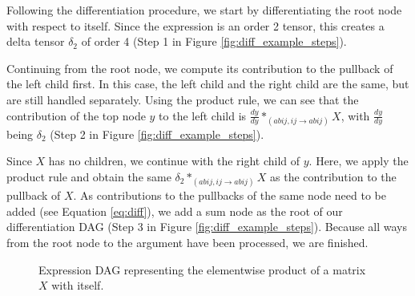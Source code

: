 \documentclass[12pt, a4paper]{report}
\begin{document}
Following the differentiation procedure, we start by differentiating the root node with respect to itself.
Since the expression is an order 2 tensor, this creates a delta tensor $\delta_2$ of order 4 (Step 1 in Figure \ref{fig:diff_example_steps}).

Continuing from the root node, we compute its contribution to the pullback of the left child first.
In this case, the left child and the right child are the same, but are still handled separately.
Using the product rule, we can see that the contribution of the top node $y$ to the left child is $\frac{dy}{dy} *_{(abij,ij \rightarrow abij)} X$, with $\frac{dy}{dy}$ being $\delta_2$ (Step 2 in Figure \ref{fig:diff_example_steps}).

Since $X$ has no children, we continue with the right child of $y$.
Here, we apply the product rule and obtain the same $\delta_2 *_{(abij,ij \rightarrow abij)} X$ as the contribution to the pullback of $X$.
As contributions to the pullbacks of the same node need to be added (see Equation \ref{eq:diff}), we add a sum node as the root of our differentiation DAG (Step 3 in Figure \ref{fig:diff_example_steps}).
Because all ways from the root node to the argument have been processed, we are finished.

\begin{figure}[h]
    \centering
    \caption{Expression DAG representing the elementwise product of a matrix $X$ with itself.}
    \label{fig:diff_example_original}
\end{figure}
\end{document}
